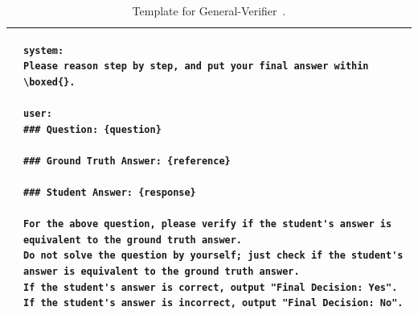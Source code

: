 \begin{table}
\centering
\footnotesize
\begin{tabular}{lp{12cm}}
\toprule

&
\begin{lstlisting}[basicstyle=\ttfamily\scriptsize, breaklines=true, aboveskip=0pt, belowskip=0pt]
system:
Please reason step by step, and put your final answer within \boxed{}.

user:
### Question: {question}

### Ground Truth Answer: {reference}

### Student Answer: {response}

For the above question, please verify if the student's answer is equivalent to the ground truth answer.
Do not solve the question by yourself; just check if the student's answer is equivalent to the ground truth answer.
If the student's answer is correct, output "Final Decision: Yes". If the student's answer is incorrect, output "Final Decision: No".
\end{lstlisting}
\\
\bottomrule
\end{tabular}
\caption{Template for General-Verifier~\citep{general-reasoner}.}
\label{tab:appendix:grade_template_general-verifier}
\end{table}




